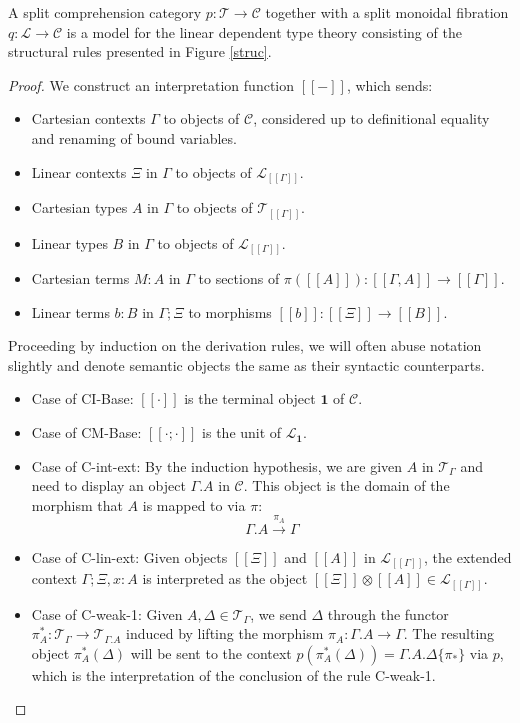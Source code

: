 \begin{thm}\label{interpret}
A split comprehension category $p : \mathcal{T} \to \mathcal{C}$ together with a split monoidal fibration $q : \mathcal{L} \to \mathcal{C}$ is a model for the linear dependent type theory consisting of the structural rules presented in Figure \ref{struc}.
\begin{proof}
  We construct an interpretation function $[[-]]$, which sends:
  \begin{itemize}
  \item Cartesian contexts $\Gamma$ to objects of $\mathcal{C}$, considered up to definitional equality and renaming of bound variables.
  \item Linear contexts $\Xi$ in $\Gamma$ to objects of $\mathcal{L}_{[[\Gamma]]}$.
  \item Cartesian types $A$ in $\Gamma$ to objects of $\mathcal{T}_{[[\Gamma]]}$.
  \item Linear types $B$ in $\Gamma$ to objects of $\mathcal{L}_{[[\Gamma]]}$.
  \item Cartesian terms $M : A$ in $\Gamma$ to sections of $\pi([[A]]) : [[\Gamma,A]] \to [[\Gamma]]$.
  \item Linear terms $b : B$ in $\Gamma; \Xi$ to morphisms $[[b]] : [[\Xi]] \to [[B]]$.
  \end{itemize}
Proceeding by induction on the derivation rules, we will often abuse notation slightly and denote semantic objects the same as their syntactic counterparts.
\begin{itemize}
\item Case of CI-Base: $[[\cdot]]$ is the terminal object $\mathbf{1}$ of $\mathcal{C}$.
\item Case of CM-Base: $[[\cdot; \cdot]]$ is the unit of $\mathcal{L}_{\mathbf{1}}$.
\item Case of C-int-ext: By the induction hypothesis, we are given $A$ in $\mathcal{T}_{\Gamma}$ and need to display an object $\Gamma.A$ in $\mathcal{C}$. This object is the domain of the morphism that $A$ is mapped to via $\pi$:
  \[\Gamma.A \xrightarrow {\pi_A} \Gamma\]
\item Case of C-lin-ext: Given objects $[[\Xi]]$ and $[[A]]$ in $\mathcal{L}_{[[\Gamma]]}$, the extended context $\Gamma; \Xi, x : A$ is interpreted as the object $[[\Xi]] \otimes [[A]] \in \mathcal{L}_{[[\Gamma]]}$.
\item Case of C-weak-1: Given $A, \Delta \in \mathcal{T}_{\Gamma}$, we send $\Delta$ through the functor $\pi_A^* : \mathcal{T}_\Gamma \to \mathcal{T}_{\Gamma.A}$ induced by lifting the morphism $\pi_A : \Gamma.A \to \Gamma$. The resulting object $\pi_A^*(\Delta)$ will be sent to the context $p(\pi_A^*(\Delta)) = \Gamma.A.\Delta\{\pi_*\}$ via $p$, which is the interpretation of the conclusion of the rule C-weak-1.

\end{itemize}
\end{proof}
\end{thm}
